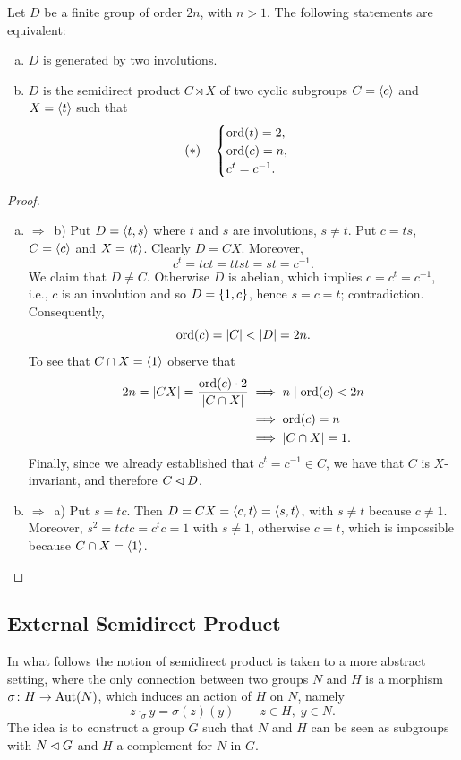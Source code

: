 \begin{thm}\label{dihedral-equivalence}
    Let\/ $D$ be a finite group of order\/ $2n$, with $n>1$. The following statements are equivalent:
    \begin{enumerate}[a),font=\upshape]
        \item $D$ is generated by two involutions.
        \item $D$ is the semidirect product\/ $C\rtimes X$ of two cyclic subgroups\/ $C = \langle c\rangle$ and\/ $X = \langle t\rangle$ such that
        $$
        (*) \quad \begin{cases}\label{eqD}
            {\rm ord}(t) = 2,\\
            {\rm ord}(c) = n,\\
            c^t = c^{-1}.
        \end{cases}
        $$
    \end{enumerate}
\end{thm}

\begin{proof}${}$
\begin{enumerate}[a),font=\upshape]
    \item $\Rightarrow$~b) Put $D=\langle t,s\rangle$ where $t$ and $s$ are involutions, $s\ne t$. Put $c=ts$, $C=\langle c\rangle$ and $X=\langle t\rangle$. Clearly $D=CX$. Moreover,
    $$
        c^t = tct = ttst = st = c^{-1}. 
    $$
    We claim that $D\ne C$. Otherwise $D$ is abelian, which implies $c=c^t=c^{-1}$, i.e., $c$ is an involution and so $D=\{1,c\}$, hence $s=c=t$; contradiction. Consequently,
    $$
        \ord(c)=|C|<|D|=2n.
    $$
    To see that $C\cap X=\langle1\rangle$ observe that
    \begin{align*}
        2n = |CX| = \frac{{\rm ord}(c)\cdot2}{|C\cap X|} &\implies n\mid {\rm ord}(c)<2n\\
            &\implies {\rm ord}(c)=n\\
            &\implies |C\cap X|=1.
    \end{align*}
    Finally, since we already established that\/ $c^t = c^{-1} \in C$, we have that\/ $C$ is\/ $X$-invariant, and therefore\/ $C\lhd D$.
    
    \item $\Rightarrow$~a) Put $s=tc$. Then $D=CX=\langle c,t\rangle=\langle s,t\rangle$, with $s\ne t$ because $c\ne 1$. Moreover, $s^2=tctc=c^tc=1$ with $s\ne1$, otherwise $c=t$, which is impossible because $C\cap X=\langle1\rangle$.
\end{enumerate}
\end{proof}

\subsection*{External Semidirect Product} In what follows the notion of semidirect product is taken to a more abstract setting, where the only connection between two groups $N$ and $H$ is a morphism $\sigma\colon H\to{\rm Aut}(N)$, which induces an action of $H$ on $N$, namely
$$
    z\cdot_\sigma y = \sigma(z)(y)\qquad z\in H,\; y\in N.
$$
The idea is to construct a group $G$ such that $N$ and $H$ can be seen as subgroups with $N\lhd G$ and $H$ a complement for $N$ in $G$.

